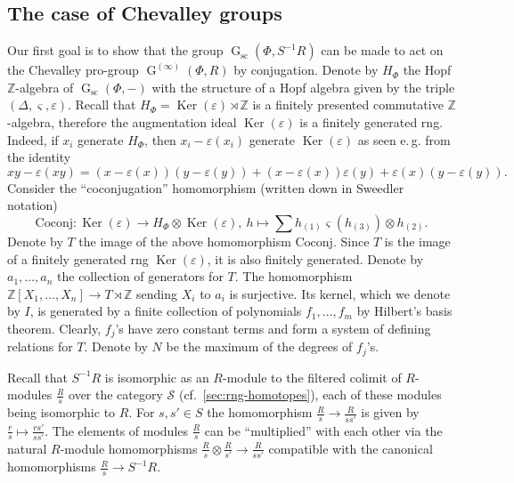 \documentclass[oneside, 11pt]{amsart}
\numberwithin{equation}{section}
\theoremstyle{definition}
\theoremstyle{remark}
\DeclareMathOperator\Ker{Ker}
\DeclareMathOperator\GG{G}
\newcommand{\ZZ}{\mathbb{Z}}
\begin{document}
\subsection{The case of Chevalley groups} \label{sec:local-Chevalley}
Our first goal is to show that the group \(\GG_{\mathrm{sc}}(\Phi, S^{-1} R)\) can be made to act on the Chevalley pro-group \(\GG^{(\infty)}(\Phi, R)\) by conjugation. Denote by \(H_\Phi\) the Hopf \(\ZZ\)-algebra of \(\GG_{\mathrm{sc}}(\Phi, -)\) with the structure of a Hopf algebra given by the triple $(\Delta, \varsigma, \varepsilon)$. Recall that \(H_\Phi= \Ker(\varepsilon) \rtimes \ZZ\) is a finitely presented commutative \(\ZZ\)-algebra, therefore the augmentation ideal $\Ker(\varepsilon)$ is a finitely generated rng. Indeed, if $x_i$ generate $H_\Phi$, then $x_i - \varepsilon(x_i)$ generate $\Ker(\varepsilon)$ as seen e.\,g. from the identity
\[xy - \varepsilon(xy) = (x - \varepsilon(x)) (y - \varepsilon(y)) + (x - \varepsilon(x)) \varepsilon(y) + \varepsilon(x) (y - \varepsilon(y)).\]
Consider the ``coconjugation'' homomorphism (written down in Sweedler notation)
\[\mathrm{Coconj} \colon \Ker(\varepsilon) \to H_\Phi \otimes \Ker(\varepsilon),\ h \mapsto \sum h_{(1)} \varsigma(h_{(3)}) \otimes h_{(2)}.\]
Denote by $T$ the image of the above homomorphism $\mathrm{Coconj}$.
Since $T$ is the image of a finitely generated rng \(\Ker(\varepsilon)\), it is also finitely generated.
Denote by \(a_1, \ldots, a_n\) the collection of generators for $T$. The homomorphism \(\ZZ[X_1, \ldots, X_n] \to T \rtimes \ZZ\) sending $X_i$ to $a_i$ is surjective. Its kernel, which we denote by \(I\), is generated by a finite collection of polynomials \(f_1, \ldots, f_m\) by Hilbert's basis theorem. Clearly, \(f_j\)'s have zero constant terms and form a system of defining relations for $T$. Denote by \(N\) be the maximum of the degrees of \(f_j\)'s.

Recall that \(S^{-1} R\) is isomorphic as an $R$-module to the filtered colimit of \(R\)-modules \(\frac Rs\) over the category $\mathcal{S}$ (cf.~\cref{sec:rng-homotopes}), each of these modules being isomorphic to $R$. For $s, s' \in S$ the homomorphism \(\frac R{s} \to \frac R{ss'}\) is given by $\tfrac{r}{s} \mapsto \tfrac{rs'}{ss'}$. The elements of modules $\frac Rs$ can be ``multiplied'' with each other via the natural $R$-module homomorphisms $\frac R s \otimes \frac R {s'} \to \frac R {ss'}$ compatible with the canonical homomorphisms $\frac R s \to S^{-1}R$.
\end{document}
